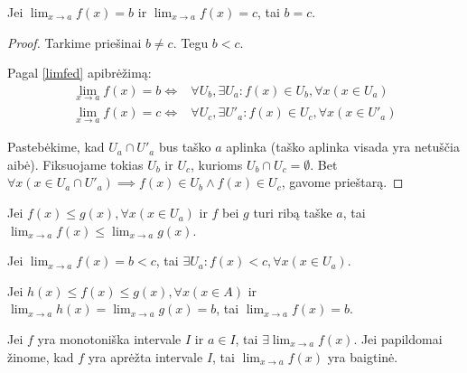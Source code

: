 \begin{prop}
  Jei $\lim _{x \to a} f(x) = b$ ir $\lim _{x \to a} f(x) = c$, tai $b = c$.
  \begin{proof}
    Tarkime priešinai $b \neq c$. Tegu $b < c$.

    Pagal \ref{limfed} apibrėžimą:
    \begin{align*}
      \lim _{x \to a} f(x) = b \iff&%
        \forall U_{b}, \exists U_{a} :%
        f(x) \in U_{b}, \forall x(x \in U_{a}) \\
      \lim _{x \to a} f(x) = c \iff&%
        \forall U_{c}, \exists U'_{a} :%
        f(x) \in U_{c}, \forall x(x \in U'_{a})
    \end{align*}

    Pastebėkime, kad $U_{a} \cap U'_{a}$ bus taško $a$ aplinka (taško 
    aplinka visada yra netuščia aibė).
    Fiksuojame tokias $U_{b}$ ir $U_{c}$, kurioms 
    $U_{b} \cap U_{c} = \emptyset$. Bet 
    $\forall x (x \in U_{a} \cap U'_{a}) \implies%
      f(x) \in U_{b} \land f(x) \in U_{c}$, gavome prieštarą.
  \end{proof}
\end{prop}

\begin{prop}
  Jei $f(x) \leq g(x), \forall x (x \in U_{a})$ ir $f$ bei $g$ turi ribą
  taške $a$, tai $\lim _{x \to a} f(x) \leq \lim _{x \to a} g(x)$.
\end{prop}

\begin{prop}
  Jei $\lim _{x \to a} f(x) = b < c$, tai 
  $\exists U_{a} : f(x) < c, \forall x (x \in U_{a})$.
\end{prop}

\begin{prop}
  Jei $h(x) \leq f(x) \leq g(x), \forall x(x \in A)$ ir 
  $\lim _{x \to a} h(x) = \lim _{x \to a} g(x) = b$, tai
  $\lim _{x \to a} f(x) = b$.
\end{prop}

\begin{prop}
  Jei $f$ yra monotoniška intervale $I$ ir $a \in I$, tai 
  $\exists \lim _{x \to a} f(x)$. Jei papildomai žinome, kad $f$ yra
  aprėžta intervale $I$, tai $\lim _{x \to a} f(x)$ yra baigtinė.
\end{prop}

